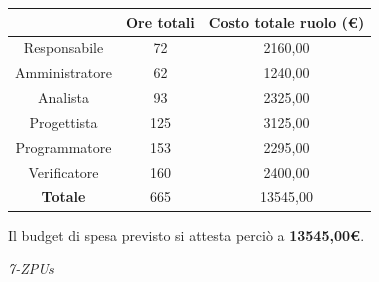 \documentclass[a4paper,12pt]{article}
\begin{document}
\begin{table}[H]
{
\centering
\begin{tabular}{c|c|c}

        & \textbf{Ore totali} & \textbf{Costo totale ruolo (€)}  \\
        \hline
        Responsabile & 72 & 2160,00 \\
        \hline
        Amministratore & 62 & 1240,00 \\
        \hline
        Analista & 93 & 2325,00 \\
        \hline
        Progettista & 125 & 3125,00 \\
        \hline
        Programmatore & 153 & 2295,00 \\
        \hline
        Verificatore & 160 & 2400,00 \\
        \hline
        \textbf{Totale} & 665 & 13545,00 \\

\end{tabular}\par
}
\end{table}
\noindent Il budget di spesa previsto si attesta perciò a \textbf{13545,00€}.

\vspace{0.5cm}


\vfill
\begin{flushright}
    \textit{7-ZPUs}
\end{flushright}
\end{document}
